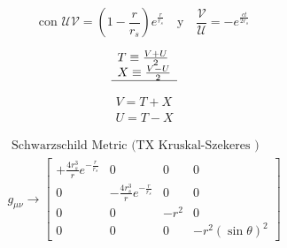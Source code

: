 \begin{equation}
    \text{con } \mathcal{U}\mathcal{V} = \left(1-\frac{r}{r_s}\right)e^{\frac{r}{r_s}} \quad \text{y} \quad \frac{\mathcal{V}}{\mathcal{U}} = -e^{\frac{ct}{2r_s}}
\end{equation}

\begin{equation}
    \begin{array}{l}
        T \equiv \frac{V+U}{2} \\
        X \equiv \frac{V-U}{2} \\
        \hline
    \end{array}
\end{equation}

\begin{equation}
    \begin{array}{l}
        V=T+X \\
        U=T-X
    \end{array}
\end{equation}


\begin{equation}
    \begin{array}{l}
        \text { Schwarzschild Metric (TX Kruskal-Szekeres ) } \\
        g_{\mu \nu} \rightarrow\left[\begin{array}{cccc}
                                             +\frac{4 r_s^3}{r} e^{-\frac{r}{r_s}} & 0                                     & 0    & 0                   \\
                                             0                                     & -\frac{4 r_s^3}{r} e^{-\frac{r}{r_s}} & 0    & 0                   \\
                                             0                                     & 0                                     & -r^2 & 0                   \\
                                             0                                     & 0                                     & 0    & -r^2(\sin \theta)^2
                                         \end{array}\right]
    \end{array}
\end{equation}